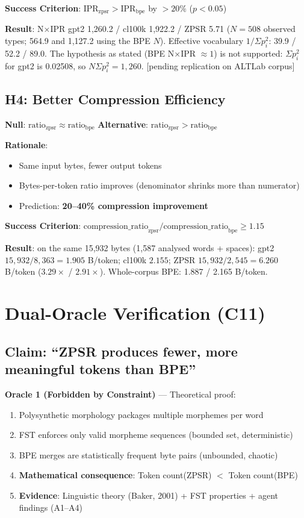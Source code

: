 \documentclass[11pt,oneside]{article}
\begin{document}
\textbf{Success Criterion}: $\text{IPR}_{\text{zpsr}} > \text{IPR}_{\text{bpe}}$ by $>20\%$ ($p < 0.05$)

\textbf{Result}: N×IPR gpt2 1,260.2 / cl100k 1,922.2 / ZPSR 5.71 ($N{=}508$ observed types; 564.9 and 1,127.2 using the BPE $N$). Effective vocabulary $1/\Sigma p_i^2$: 39.9 / 52.2 / 89.0. The hypothesis as stated (BPE N×IPR $\approx 1$) is not supported: $\Sigma p_i^2$ for gpt2 is 0.02508, so $N\Sigma p_i^2 = 1{,}260$. [pending replication on ALTLab corpus]

\subsection{H4: Better Compression Efficiency}

\textbf{Null}: $\text{ratio}_{\text{zpsr}} \approx \text{ratio}_{\text{bpe}}$
\textbf{Alternative}: $\text{ratio}_{\text{zpsr}} > \text{ratio}_{\text{bpe}}$

\textbf{Rationale}:
\begin{itemize}
  \item Same input bytes, fewer output tokens
  \item Bytes-per-token ratio improves (denominator shrinks more than numerator)
  \item Prediction: \textbf{20--40\% compression improvement}
\end{itemize}

\textbf{Success Criterion}: $\text{compression\_ratio}_{\text{zpsr}} / \text{compression\_ratio}_{\text{bpe}} \geq 1.15$

\textbf{Result}: on the same 15,932 bytes (1,587 analysed words + spaces): gpt2 $15{,}932/8{,}363 = 1.905$ B/token; cl100k $2.155$; ZPSR $15{,}932/2{,}545 = 6.260$ B/token ($3.29\times$ / $2.91\times$). Whole-corpus BPE: 1.887 / 2.165 B/token.

\section{Dual-Oracle Verification (C11)}

\subsection{Claim: ``ZPSR produces fewer, more meaningful tokens than BPE''}

\textbf{Oracle 1 (Forbidden by Constraint)} --- Theoretical proof:

\begin{enumerate}
  \item Polysynthetic morphology packages multiple morphemes per word
  \item FST enforces only valid morpheme sequences (bounded set, deterministic)
  \item BPE merges are statistically frequent byte pairs (unbounded, chaotic)
  \item \textbf{Mathematical consequence}: Token count(ZPSR) $<$ Token count(BPE)
  \item \textbf{Evidence}: Linguistic theory (Baker, 2001) + FST properties + agent findings (A1--A4)
\end{enumerate}
\end{document}
